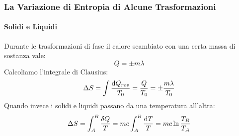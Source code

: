 \documentclass{article}
\begin{document}
\subsubsection{La Variazione di Entropia di Alcune Trasformazioni}
\paragraph{Solidi e Liquidi}
Durante le trasformazioni di fase il calore scambiato con una certa massa di sostanza vale:
\[Q=\pm m\lambda\]
Calcoliamo l'integrale di Clausius:
\begin{equation}
    \Delta S=\int \frac{\dif Q_{rev}}{T_0}=\frac{Q}{T_0}=\pm\frac{m\lambda}{T_0}
\end{equation}
Quando invece i solidi e liquidi passano da una temperatura all'altra:
\[\Delta S=\int_A^B\frac{\delta Q}{T}=mc\int_A^B\frac{\dif T}{T}=mc\ln\frac{T_B}{T_A}\]
\end{document}
